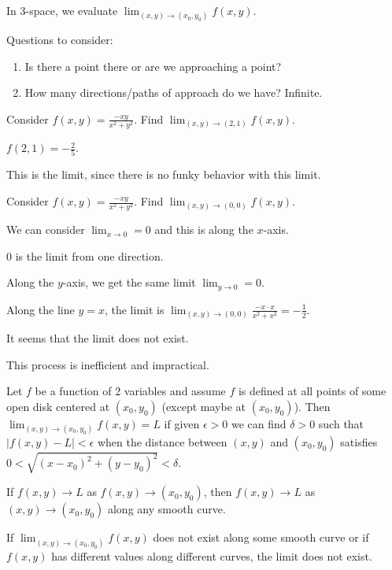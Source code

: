 \documentclass[../calc3.tex]{subfiles}
\begin{document}
In 3-space, we evaluate $\lim_{(x,y)\to (x_0,y_0)}f(x,y)$.

Questions to consider:
\begin{enumerate}
    \item Is there a point there or are we approaching a point?
    \item How many directions/paths of approach do we have? Infinite.
\end{enumerate}


\begin{example}
    Consider $f(x,y)=\frac{-xy}{x^2+y^2}$. Find $\lim_{(x,y)\to (2,1)}f(x,y)$.

    $f(2,1)=-\frac{2}{5}$.

    This is the limit, since there is no funky behavior with this limit.
\end{example}

\pagebreak
\begin{example}
    Consider $f(x,y)=\frac{-xy}{x^2+y^2}$. Find $\lim_{(x,y)\to (0,0)}f(x,y)$.

    We can consider $\lim_{x\to 0}=0$ and this is along the $x$-axis.

    $0$ is the limit from one direction.

    Along the $y$-axis, we get the same limit $\lim_{y\to 0}=0$.

    Along the line $y=x$, the limit is $\lim_{(x,y)\to (0,0)}\frac{-x\cdot x}{x^2+x^2}=-\frac{1}{2}$.

    It seems that the limit does not exist.

    This process is inefficient and impractical.
\end{example}

\begin{definition}
    Let $f$ be a function of 2 variables and assume $f$ is defined at all points of some open disk centered at $(x_0,y_0)$ (except maybe at $(x_0,y_0)$). Then $\lim_{(x,y)\to (x_0,y_0)}f(x,y)=L$ if given $\epsilon>0$ we can find $\delta>0$ such that $|f(x,y)-L|<\epsilon$ when the distance 
    between $(x,y)$ and $(x_0,y_0)$ satisfies $0<\sqrt{(x-x_0)^2+(y-y_0)^2}<\delta$.
\end{definition}

\begin{theorem}
    If $f(x,y)\rightarrow L$ as $f(x,y)\rightarrow (x_0,y_0)$, then $f(x,y)\rightarrow L$ as $(x,y)\rightarrow (x_0,y_0)$ along any smooth curve.

    If $\lim_{(x,y)\to (x_0,y_0)}f(x,y)$ does not exist along some smooth curve or if $f(x,y)$ has different values along different curves, the limit does not exist.
\end{theorem}
\end{document}
